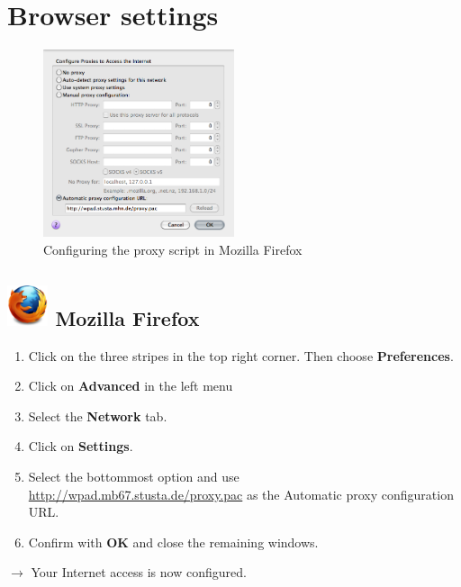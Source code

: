 \documentclass[a4paper,12pt]{scrartcl}
\newcommand{\optemph}[1]{\textbf{#1}}
\begin{document}
\newpage

\section*{Browser settings}

\begin{figure}
  \vspace{-30pt}
  \begin{center}
    \includegraphics[width=0.5\textwidth,keepaspectratio]{Bilder/Proxy_Firefox_EN}
  \end{center}
  \caption{Configuring the proxy script in Mozilla Firefox}
\end{figure}

\subsection*{\includegraphics[height=1.2cm,keepaspectratio]{Bilder/Firefox_35_logo} Mozilla Firefox}
\begin{enumerate}
	\item Click on the three stripes in the top right corner. Then choose \optemph{Preferences}.
	\item Click on \optemph{Advanced} in the left menu
	\item Select the \optemph{Network} tab.
	\item Click on \optemph{Settings}.
    \item Select the bottommost option and use \\ \url{http://wpad.mb67.stusta.de/proxy.pac} as the Automatic proxy configuration URL.
	\item Confirm with \optemph{OK} and close the remaining windows.
\end{enumerate}
$\rightarrow$ Your Internet access is now configured.
\end{document}
